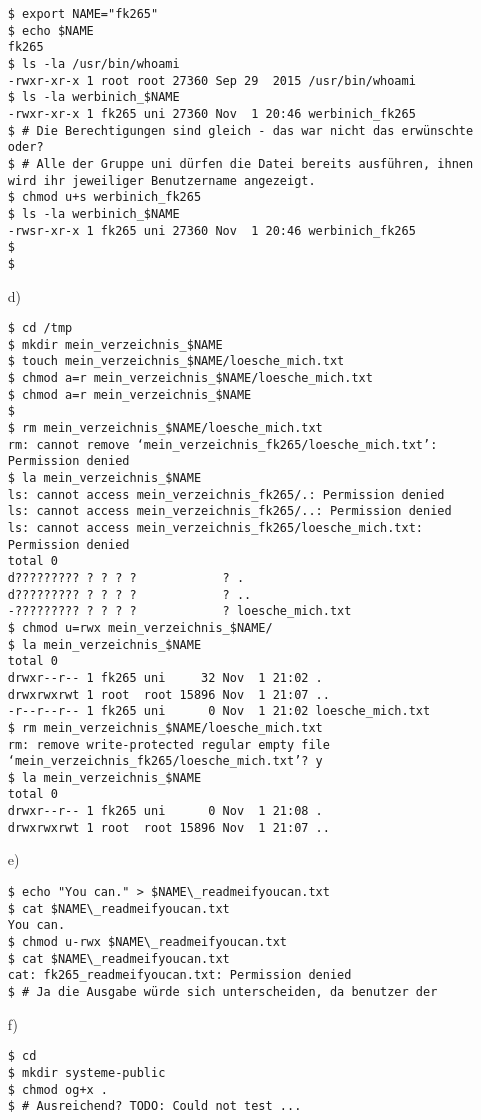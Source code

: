 \documentclass{scrartcl}
\begin{document}
\begin{itemize}
\begin{verbatim}
$ export NAME="fk265"
$ echo $NAME
fk265
$ ls -la /usr/bin/whoami
-rwxr-xr-x 1 root root 27360 Sep 29  2015 /usr/bin/whoami
$ ls -la werbinich_$NAME
-rwxr-xr-x 1 fk265 uni 27360 Nov  1 20:46 werbinich_fk265
$ # Die Berechtigungen sind gleich - das war nicht das erwünschte oder?
$ # Alle der Gruppe uni dürfen die Datei bereits ausführen, ihnen wird ihr jeweiliger Benutzername angezeigt.
$ chmod u+s werbinich_fk265
$ ls -la werbinich_$NAME
-rwsr-xr-x 1 fk265 uni 27360 Nov  1 20:46 werbinich_fk265
$
$\end{verbatim}
  \item[d)]
\begin{verbatim}
$ cd /tmp
$ mkdir mein_verzeichnis_$NAME
$ touch mein_verzeichnis_$NAME/loesche_mich.txt
$ chmod a=r mein_verzeichnis_$NAME/loesche_mich.txt
$ chmod a=r mein_verzeichnis_$NAME
$
$ rm mein_verzeichnis_$NAME/loesche_mich.txt
rm: cannot remove ‘mein_verzeichnis_fk265/loesche_mich.txt’: Permission denied
$ la mein_verzeichnis_$NAME
ls: cannot access mein_verzeichnis_fk265/.: Permission denied
ls: cannot access mein_verzeichnis_fk265/..: Permission denied
ls: cannot access mein_verzeichnis_fk265/loesche_mich.txt: Permission denied
total 0
d????????? ? ? ? ?            ? .
d????????? ? ? ? ?            ? ..
-????????? ? ? ? ?            ? loesche_mich.txt
$ chmod u=rwx mein_verzeichnis_$NAME/
$ la mein_verzeichnis_$NAME
total 0
drwxr--r-- 1 fk265 uni     32 Nov  1 21:02 .
drwxrwxrwt 1 root  root 15896 Nov  1 21:07 ..
-r--r--r-- 1 fk265 uni      0 Nov  1 21:02 loesche_mich.txt
$ rm mein_verzeichnis_$NAME/loesche_mich.txt
rm: remove write-protected regular empty file ‘mein_verzeichnis_fk265/loesche_mich.txt’? y
$ la mein_verzeichnis_$NAME
total 0
drwxr--r-- 1 fk265 uni      0 Nov  1 21:08 .
drwxrwxrwt 1 root  root 15896 Nov  1 21:07 ..
\end{verbatim}
  \item[e)]
\begin{verbatim}
$ echo "You can." > $NAME\_readmeifyoucan.txt
$ cat $NAME\_readmeifyoucan.txt
You can.
$ chmod u-rwx $NAME\_readmeifyoucan.txt
$ cat $NAME\_readmeifyoucan.txt
cat: fk265_readmeifyoucan.txt: Permission denied
$ # Ja die Ausgabe würde sich unterscheiden, da benutzer der 
\end{verbatim}
  \item[f)]
\begin{verbatim}
$ cd
$ mkdir systeme-public
$ chmod og+x .
$ # Ausreichend? TODO: Could not test ...
\end{verbatim}

\end{itemize}
\end{document}
